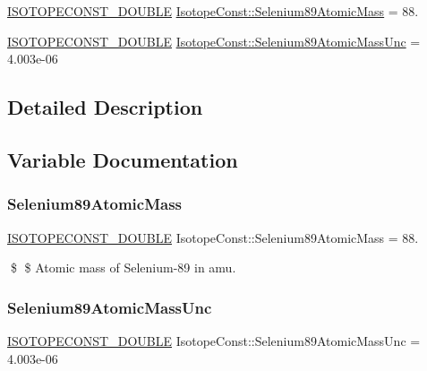 \begin{DoxyCompactItemize}
\item 
\mbox{\hyperlink{group___isotope_const-_macros_ga8f45a7272ce02c0b4c65c44636ed719a}{I\+S\+O\+T\+O\+P\+E\+C\+O\+N\+S\+T\+\_\+\+D\+O\+U\+B\+LE}} \mbox{\hyperlink{group___isotope_const-_selenium-_se89_ga2bca2da3ef3d78aa4fc581bdf2257893}{Isotope\+Const\+::\+Selenium89\+Atomic\+Mass}} = 88.
\item 
\mbox{\hyperlink{group___isotope_const-_macros_ga8f45a7272ce02c0b4c65c44636ed719a}{I\+S\+O\+T\+O\+P\+E\+C\+O\+N\+S\+T\+\_\+\+D\+O\+U\+B\+LE}} \mbox{\hyperlink{group___isotope_const-_selenium-_se89_gad9d861c44e41d6c0217ef678983e0ace}{Isotope\+Const\+::\+Selenium89\+Atomic\+Mass\+Unc}} = 4.\+003e-\/06
\end{DoxyCompactItemize}


\subsection{Detailed Description}


\subsection{Variable Documentation}
\mbox{\label{group___isotope_const-_selenium-_se89_ga2bca2da3ef3d78aa4fc581bdf2257893}} 
\subsubsection{\texorpdfstring{Selenium89\+Atomic\+Mass}{Selenium89AtomicMass}}
{\footnotesize\ttfamily \mbox{\hyperlink{group___isotope_const-_macros_ga8f45a7272ce02c0b4c65c44636ed719a}{I\+S\+O\+T\+O\+P\+E\+C\+O\+N\+S\+T\+\_\+\+D\+O\+U\+B\+LE}} Isotope\+Const\+::\+Selenium89\+Atomic\+Mass = 88.}

\$ \$ Atomic mass of Selenium-\/89 in amu. \mbox{\label{group___isotope_const-_selenium-_se89_gad9d861c44e41d6c0217ef678983e0ace}} 
\subsubsection{\texorpdfstring{Selenium89\+Atomic\+Mass\+Unc}{Selenium89AtomicMassUnc}}
{\footnotesize\ttfamily \mbox{\hyperlink{group___isotope_const-_macros_ga8f45a7272ce02c0b4c65c44636ed719a}{I\+S\+O\+T\+O\+P\+E\+C\+O\+N\+S\+T\+\_\+\+D\+O\+U\+B\+LE}} Isotope\+Const\+::\+Selenium89\+Atomic\+Mass\+Unc = 4.\+003e-\/06}

